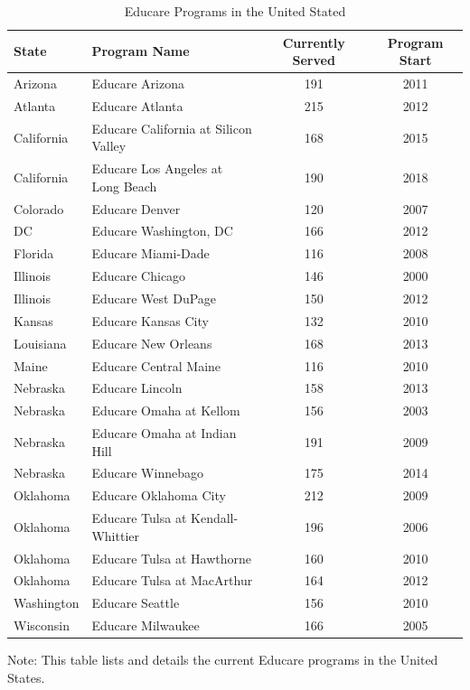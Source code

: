 \begin{table}[H]
\caption{Educare Programs in the United Stated}
\begin{center}
\begin{tabular}{llcc}
\toprule
\textbf{State} & \textbf{Program Name} & \textbf{Currently Served} & \textbf{Program Start} \\
\midrule
Arizona & Educare Arizona & 191 & 2011\\
Atlanta & Educare Atlanta & 215 & 2012 \\
California & Educare California at Silicon Valley & 168 & 2015 \\
California & Educare Los Angeles at Long Beach & 190 & 2018 \\
Colorado & Educare Denver & 120 & 2007 \\
DC & Educare Washington, DC & 166 & 2012 \\
Florida & Educare Miami-Dade & 116 & 2008 \\
Illinois & Educare Chicago & 146 & 2000 \\
Illinois & Educare West DuPage & 150 & 2012 \\
Kansas & Educare Kansas City & 132 & 2010 \\
Louisiana & Educare New Orleans & 168 & 2013 \\
Maine & Educare Central Maine & 116  &  2010 \\
Nebraska & Educare Lincoln & 158 & 2013 \\
Nebraska & Educare Omaha at Kellom & 156 & 2003 \\
Nebraska & Educare Omaha at Indian Hill & 191 & 2009 \\
Nebraska & Educare Winnebago & 175 & 2014 \\
Oklahoma & Educare Oklahoma City & 212 &  2009 \\
Oklahoma & Educare Tulsa at Kendall-Whittier & 196 & 2006 \\
Oklahoma & Educare Tulsa at Hawthorne & 160 &  2010 \\
Oklahoma & Educare Tulsa at MacArthur & 164 & 2012 \\
Washington & Educare Seattle & 156 &  2010 \\
Wisconsin & Educare Milwaukee & 166 &  2005 \\
\bottomrule
\end{tabular}
\end{center}
{\flushleft \footnotesize Note: This table lists and details the current Educare programs in the United States.\\}
\end{table}


